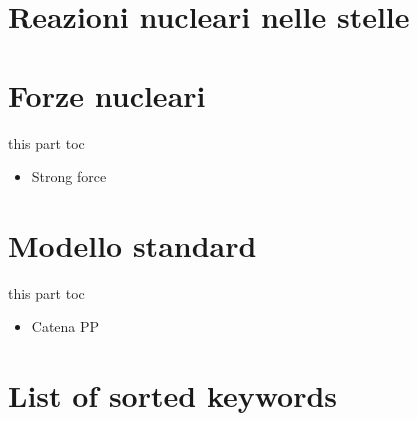 \documentclass[10pt,xcolor={usenames},fleqn,mathserif,serif]{beamer}
\begin{document}
\part{Reazioni nucleari nelle stelle}



\part{Forze nucleari}
\begin{frame}{this part toc}
\begin{itemize}
\item Strong force
\end{itemize}
\end{frame}


\part{Modello standard}
\frame{\partpage}
\begin{frame}{this part toc}
\begin{itemize}
\item Catena PP
\end{itemize}
\end{frame}



\part{List of sorted keywords}
\listofsortedkeywords
\end{document}
